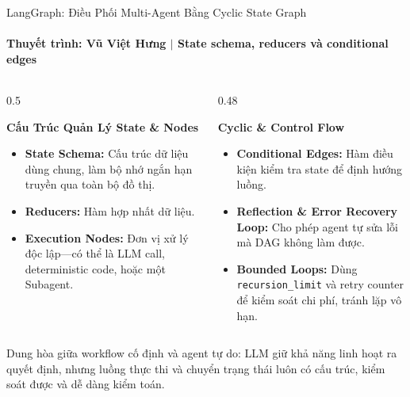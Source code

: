 \documentclass[aspectratio=1610,10pt,xcolor={table}]{beamer}
\begin{document}
\begin{frame}{LangGraph: Điều Phối Multi-Agent Bằng Cyclic State Graph}
  \framesubtitle{Thuyết trình: Vũ Việt Hưng $\vert$ State schema, reducers và conditional edges}

  \begin{columns}[t]
    \begin{column}{0.5\textwidth}
      \begin{block}{\textbf{Cấu Trúc Quản Lý State \& Nodes}}
        \scriptsize
        \begin{itemize}
          \item \textbf{State Schema:} Cấu trúc dữ liệu dùng chung, làm bộ nhớ ngắn hạn truyền qua toàn bộ đồ thị.
          \item \textbf{Reducers:} Hàm hợp nhất dữ liệu.
          \item \textbf{Execution Nodes:} Đơn vị xử lý độc lập—có thể là LLM call, deterministic code, hoặc một Subagent.
        \end{itemize}
      \end{block}
    \end{column}

    \begin{column}{0.48\textwidth}
      \begin{alertblock}{\textbf{Cyclic \& Control Flow}}
        \scriptsize
        \begin{itemize}
          \item \textbf{Conditional Edges:} Hàm điều kiện kiểm tra state để định hướng luồng.
          \item \textbf{Reflection \& Error Recovery Loop:} Cho phép agent tự sửa lỗi mà DAG không làm được.
          \item \textbf{Bounded Loops:} Dùng \texttt{recursion\_limit} và retry counter để kiểm soát chi phí, tránh lặp vô hạn.
        \end{itemize}
      \end{alertblock}
    \end{column}
  \end{columns}

  \vspace{0.15cm}
  \begin{tcolorbox}[colback=boxbg,colframe=hcmutblue,title={\textbf{Giá Trị Cốt Lõi Trong Orchestration}},fonttitle=\footnotesize\bfseries]
    \footnotesize Dung hòa giữa workflow cố định và agent tự do: LLM giữ khả năng linh hoạt ra quyết định, nhưng luồng thực thi và chuyển trạng thái luôn có cấu trúc, kiểm soát được và dễ dàng kiểm toán.
  \end{tcolorbox}
\end{frame}
\end{document}
